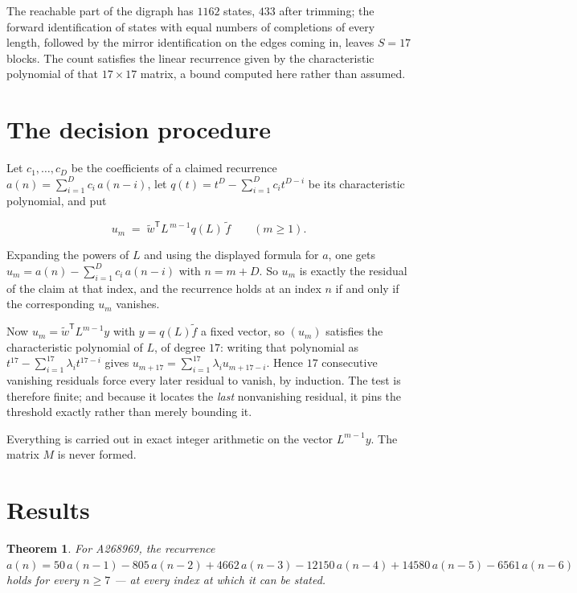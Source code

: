 \documentclass[11pt]{article}
\newtheorem{theorem}{Theorem}
\theoremstyle{definition}
\begin{document}
The reachable part of the digraph has $1162$ states, $433$ after trimming; the forward identification of states with equal numbers of completions of every length, followed by the mirror identification on the edges coming in, leaves $S = 17$ blocks. The count satisfies the linear recurrence given by the characteristic polynomial of that $17\times17$ matrix, a bound computed here rather than assumed.

\section{The decision procedure}

Let $c_1,\dots,c_D$ be the coefficients of a claimed recurrence $a(n) = \sum_{i=1}^{D} c_i\,a(n-i)$, let $q(t) = t^{D} - \sum_{i=1}^{D} c_i t^{D-i}$ be its characteristic polynomial, and put

\[u_m \;=\; \tilde w^{\mathsf T} L^{\,m-1} q(L)\,\tilde f \qquad (m \ge 1).\]

Expanding the powers of $L$ and using the displayed formula for $a$, one gets $u_m = a(n) - \sum_{i=1}^{D} c_i\,a(n-i)$ with $n = m + D$. So $u_m$ is exactly the residual of the claim at that index, and the recurrence holds at an index $n$ if and only if the corresponding $u_m$ vanishes.

Now $u_m = \tilde w^{\mathsf T} L^{m-1} y$ with $y = q(L)\tilde f$ a fixed vector, so $(u_m)$ satisfies the characteristic polynomial of $L$, of degree $17$: writing that polynomial as $t^{17} - \sum_{i=1}^{17} \lambda_i t^{17-i}$ gives $u_{m+17} = \sum_{i=1}^{17} \lambda_i u_{m+17-i}$. Hence $17$ consecutive vanishing residuals force every later residual to vanish, by induction. The test is therefore finite; and because it locates the {\itshape last} nonvanishing residual, it pins the threshold exactly rather than merely bounding it.

Everything is carried out in exact integer arithmetic on the vector $L^{m-1}y$. The matrix $M$ is never formed.

\section{Results}

\begin{theorem} For A268969, the recurrence $a(n) = 50\,a(n-1) - 805\,a(n-2) + 4662\,a(n-3) - 12150\,a(n-4) + 14580\,a(n-5) - 6561\,a(n-6)$ holds for every $n \ge 7$ --- at every index at which it can be stated.\end{theorem}
\end{document}
